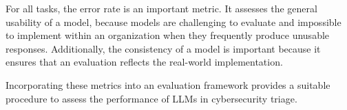 For all tasks, the error rate is an important metric.
It assesses the general usability of a model, because models are challenging to evaluate and impossible to implement
within an organization when they frequently produce unusable responses.
Additionally, the consistency of a model is important because it ensures that an evaluation reflects the real-world
implementation.

Incorporating these metrics into an evaluation framework provides a suitable procedure to assess the performance of LLMs
in cybersecurity triage.